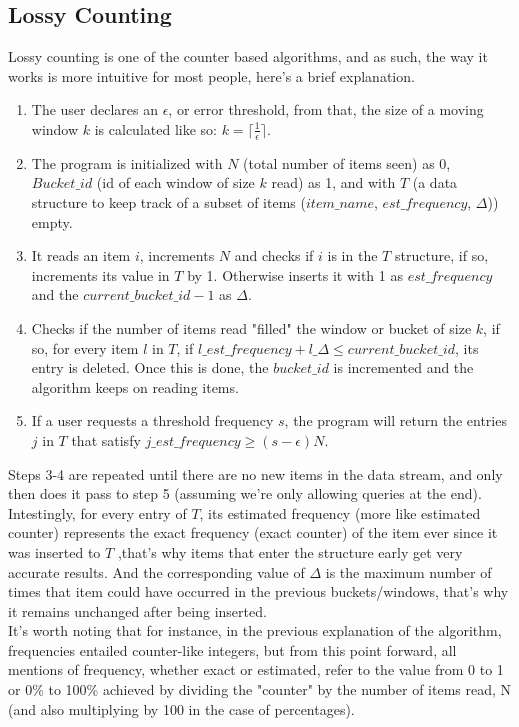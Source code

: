 \documentclass[...]{revdetua}
\begin{document}
\subsection{Lossy Counting}
Lossy counting is one of the counter based algorithms, and as such, the way it works is more intuitive for most people, here's a brief explanation.\par
\begin{enumerate}
\item The user declares an $\epsilon$, or error threshold, from that, the size of a moving window $k$ is calculated like so: $k=\lceil\frac{1}{\epsilon}\rceil$.
\item The program is initialized with $N$ (total number of items seen) as 0, $Bucket\_id$ (id of each window of size $k$ read) as 1, and with $T$ (a data structure to keep track of a subset of items ($item\_name$, $est\_frequency$, $\Delta$)) empty.
\item It reads an item $i$, increments $N$ and checks if $i$ is in the $T$ structure, if so, increments its value in $T$ by 1. Otherwise inserts it with 1 as $est\_frequency$ and the $current\_bucket\_id - 1$ as $\Delta$.
\item Checks if the number of items read "filled" the window or bucket of size $k$, if so, for every item $l$ in $T$, if $l\_est\_frequency + l\_\Delta \leq current\_bucket\_id$, its entry is deleted. Once this is done, the $bucket\_id$ is incremented and the algorithm keeps on reading items.
\item If a user requests a threshold  frequency $s$, the program will return the entries $j$ in $T$ that satisfy $j\_est\_frequency \geq (s-\epsilon)N$.
\end{enumerate}
Steps 3-4 are repeated until there are no new items in the data stream, and only then does it pass to step 5 (assuming we're only allowing queries at the end).\\
Intestingly, for every entry of $T$, its estimated frequency (more like estimated counter) represents the exact frequency (exact counter) of the item ever since it was inserted to $T$ \cite{Manku},that's why items that enter the structure early get very accurate results. And the corresponding value of $\Delta$ is the maximum number of times that item could have occurred in the previous buckets/windows, that's why it remains unchanged after being inserted.\\
It's worth noting that for instance, in the previous explanation of the algorithm, frequencies entailed counter-like integers, but from this point forward, all mentions of frequency, whether exact or estimated, refer to the value from 0 to 1 or 0\% to 100\% achieved by dividing the "counter" by the number of items read, N (and also multiplying by 100 in the case of percentages).\\
\end{document}

